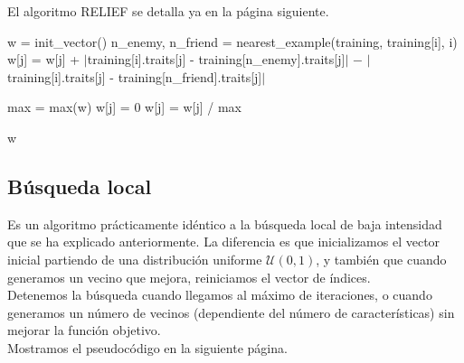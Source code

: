 \documentclass[12pt]{article}
\begin{document}
El algoritmo RELIEF se detalla ya en la página siguiente.
\newpage

\begin{algorithm}[h!]
\begin{algorithmic}

     \State w = init\_vector()
       
         \State n\_enemy, n\_friend = nearest\_example(training, training[i], i)
           
            \State w[j] = w[j] + $|$training[i].traits[j] - training[n\_enemy].traits[j]$|$
            \State \hspace{2.5em} $-$ $|$training[i].traits[j] - training[n\_friend].traits[j]$|$
          
         \EndFor
      \EndFor
      \State max = max(w)
        
            \State w[j] = 0
        \Else
            \State w[j] = w[j] / max
        \EndIf
      
\hspace{-.7em} \Return w
\EndFunction

\end{algorithmic}
\end{algorithm}


\subsection*{{\color{red} Búsqueda local}}

Es un algoritmo prácticamente idéntico a la búsqueda local de baja intensidad que se ha explicado anteriormente. La diferencia es que inicializamos el vector inicial partiendo de una distribución uniforme $\mathcal U(0,1)$, y también que cuando generamos un vecino que mejora, reiniciamos el vector de índices. \\

Detenemos la búsqueda cuando llegamos al máximo de iteraciones, o cuando generamos un número de vecinos (dependiente del número de características) sin mejorar la función objetivo.\\

Mostramos el pseudocódigo en la siguiente página.

\newpage
\end{document}
